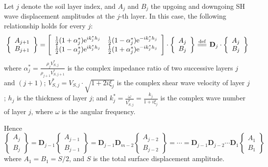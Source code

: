 \documentclass[11pt,letterpaper]{article}
\newcommand{\f}[2]{\frac{#1}{#2}}
\newcommand{\xeq}[1]{\stackrel{\;#1}{\cleaders\hbox{=\!}\hfill}\:} %
\newcommand{\eqdef}{\xeq{\mathrm{def}}}
\newcommand{\mrm}{\mathrm}
\begin{document}
Let $ j $ denote the soil layer index, and $ A_j $ and $ B_j $ the upgoing and downgoing SH wave displacement amplitudes at the $ j $-th layer.  In this case, the following relationship holds for every $ j $:
\begin{equation}
 \left\{\begin{array}{c}
A_{j+1} \\
B_{j+1}
\end{array} \right\} = \left[\begin{array}{cc}
\f{1}{2}(1+\alpha^*_j)\mrm{e}^{ik^*_jh_j} & \f{1}{2}(1-\alpha^*_j)\mrm{e}^{-ik^*_jh_j} \\
\f{1}{2}(1-\alpha^*_j)\mrm{e}^{ik^*_jh_j} & \f{1}{2}(1+\alpha^*_j)\mrm{e}^{-ik^*_jh_j}
\end{array} \right]\cdot \left\{\begin{array}{c}
A_j \\
B_j
\end{array} \right\}  \eqdef \mathbf{D}_j\cdot \left\{\begin{array}{c}
A_j \\
B_j
\end{array} \right\}
\end{equation}
where $ \alpha_j^* = \displaystyle\f{\rho_j V^*_{S,j}}{\rho_{j+1} V^*_{S,j+1}}$ is the complex impedance ratio of two successive layers $ j $ and $ (j+1) $;  \newline $ V^*_{S,j} = V_{S,j}\cdot\sqrt{1+2i\xi_j}$ is the complex shear wave velocity of layer $ j $; $ h_j $ is the thickness of layer $ j $; and $ k^*_j = \displaystyle\f{\omega}{V^*_{S,j}} = \f{k_j}{1+i\xi_j}$ is the complex wave number of layer $ j $, where $ \omega $ is the angular frequency.

Hence
\begin{equation}
	\left\{\begin{array}{c}
A_j \\
B_j
\end{array} \right\} = \mathbf{D}_{j-1} \left\{\begin{array}{c}
A_{j-1} \\
B_{j-1}
\end{array} \right\} = \mathbf{D}_{j-1}\mathbf{D}_{m-2}\left\{\begin{array}{c}
A_{j-2} \\
B_{j-2}
\end{array} \right\} = \cdots = \mathbf{D}_{j-1}\mathbf{D}_{j-2}\cdots\mathbf{D}_{1}\left\{\begin{array}{c}
A_{1} \\
B_{1}
\end{array} \right\}
\label{eq:j_to_1}
\end{equation}
where $ A_1 = B_1 = S/2 $, and $ S $ is the total surface displacement amplitude.
\end{document}

